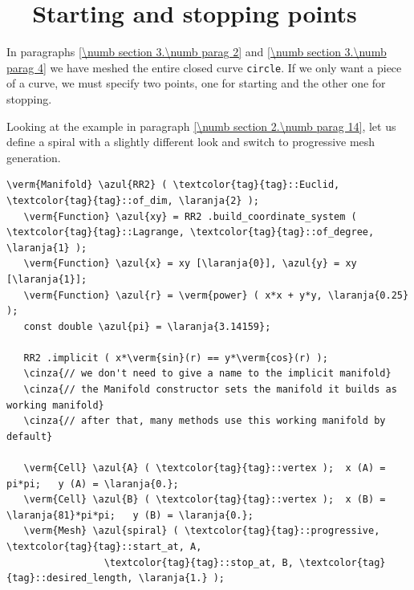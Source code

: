 \section{~~Starting and stopping points}\label{\numb section 3.\numb parag 5}

In paragraphs \ref{\numb section 3.\numb parag 2} and \ref{\numb section 3.\numb parag 4}
we have meshed the entire closed curve {\small\tt circle}.
If we only want a piece of a curve, we must specify two points, one for starting and
the other one for stopping.

Looking at the example in paragraph \ref{\numb section 2.\numb parag 14}, let us define a
spiral with a slightly different look and switch to progressive mesh generation.

\begin{Verbatim}[commandchars=\\\{\},formatcom=\small\tt,frame=single,
   label=parag-\ref{\numb section 3.\numb parag 5}.cpp,rulecolor=\color{coment},
   baselinestretch=0.94,framesep=2mm                                            ]
   \verm{Manifold} \azul{RR2} ( \textcolor{tag}{tag}::Euclid, \textcolor{tag}{tag}::of_dim, \laranja{2} );
   \verm{Function} \azul{xy} = RR2 .build_coordinate_system ( \textcolor{tag}{tag}::Lagrange, \textcolor{tag}{tag}::of_degree, \laranja{1} );
   \verm{Function} \azul{x} = xy [\laranja{0}], \azul{y} = xy [\laranja{1}];
   \verm{Function} \azul{r} = \verm{power} ( x*x + y*y, \laranja{0.25} );
   const double \azul{pi} = \laranja{3.14159};
   
   RR2 .implicit ( x*\verm{sin}(r) == y*\verm{cos}(r) );
   \cinza{// we don't need to give a name to the implicit manifold}
   \cinza{// the Manifold constructor sets the manifold it builds as working manifold}
   \cinza{// after that, many methods use this working manifold by default}
   
   \verm{Cell} \azul{A} ( \textcolor{tag}{tag}::vertex );  x (A) =    pi*pi;   y (A) = \laranja{0.};
   \verm{Cell} \azul{B} ( \textcolor{tag}{tag}::vertex );  x (B) = \laranja{81}*pi*pi;   y (B) = \laranja{0.};
   \verm{Mesh} \azul{spiral} ( \textcolor{tag}{tag}::progressive, \textcolor{tag}{tag}::start_at, A,
                 \textcolor{tag}{tag}::stop_at, B, \textcolor{tag}{tag}::desired_length, \laranja{1.} );
\end{Verbatim}

